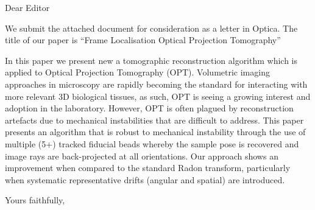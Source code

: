 \documentclass{letter}
\begin{document}
\begin{letter}{}
\opening{Dear Editor}

We submit the attached document for consideration as a letter in Optica. The title of our paper is ``Frame Localisation Optical Projection Tomography''

In this paper we present new a tomographic reconstruction algorithm which is applied to Optical Projection Tomography (OPT). Volumetric imaging approaches in microscopy are rapidly becoming the standard for interacting with more relevant 3D biological tissues, as such, OPT is seeing a growing interest and adoption in the laboratory. However, OPT is often plagued by reconstruction artefacts due to mechanical instabilities that are difficult to address. This paper presents an algorithm that is robust to mechanical instability through the use of multiple (5+) tracked fiducial beads whereby the sample pose is recovered and image rays are back-projected at all orientations. Our approach shows an improvement when compared to the standard Radon transform, particularly when systematic representative drifts (angular and spatial) are introduced.

%
%
%

%

\closing{Yours faithfully,}

%
%

\end{letter}
\end{document}
